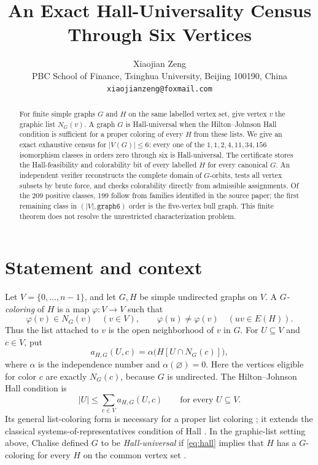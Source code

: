 \documentclass[11pt]{article}
\title{An Exact Hall-Universality Census Through Six Vertices}
\author{Xiaojian Zeng\\
\small PBC School of Finance, Tsinghua University, Beijing 100190, China\\
\small \texttt{xiaojianzeng@foxmail.com}}
\date{}
\begin{document}
\maketitle

\begin{abstract}
For finite simple graphs $G$ and $H$ on the same labelled vertex set, give
vertex $v$ the graphic list $N_G(v)$.  A graph $G$ is Hall-universal when the
Hilton--Johnson Hall condition is sufficient for a proper coloring of every
$H$ from these lists.  We give an exact exhaustive census for $|V(G)|\leq 6$:
every one of the $1,1,2,4,11,34,156$ isomorphism classes in orders zero through
six is Hall-universal.  The certificate stores the Hall-feasibility and
colorability bit of every labelled $H$ for every canonical $G$.  An independent
verifier reconstructs the complete domain of $G$-orbits, tests all vertex
subsets by brute force, and checks colorability directly from admissible
assignments.  Of the 209 positive classes, 199 follow from families identified
in the source paper; the first remaining class in $(|V|,\texttt{graph6})$ order
is the five-vertex bull graph.  This finite theorem does not resolve the
unrestricted characterization problem.
\end{abstract}

\section{Statement and context}

Let $V=\{0,\ldots,n-1\}$, and let $G,H$ be simple undirected graphs on $V$.
A \emph{$G$-coloring} of $H$ is a map $\varphi:V\to V$ such that
\[
  \varphi(v)\in N_G(v)\quad(v\in V),
  \qquad
  \varphi(u)\ne\varphi(v)\quad(uv\in E(H)).
\]
Thus the list attached to $v$ is the open neighborhood of $v$ in $G$.
For $U\subseteq V$ and $c\in V$, put
\[
  a_{H,G}(U,c)=\alpha\bigl(H[U\cap N_G(c)]\bigr),
\]
where $\alpha$ is the independence number and $\alpha(\varnothing)=0$.
Here the vertices eligible for color $c$ are exactly $N_G(c)$, because $G$ is
undirected.
The Hilton--Johnson Hall condition is
\begin{equation}\label{eq:hall}
  |U|\leq \sum_{c\in V}a_{H,G}(U,c)
  \qquad\text{for every }U\subseteq V.
\end{equation}
Its general list-coloring form is necessary for a proper list coloring
\cite{HiltonJohnson1990}; it extends the classical systems-of-representatives
condition of Hall \cite{Hall1935}.  In the graphic-list setting above, Chalise
defined $G$ to be \emph{Hall-universal} if \eqref{eq:hall} implies that $H$ has
a $G$-coloring for every $H$ on the common vertex set
\cite{Chalise2026}.
\end{document}
